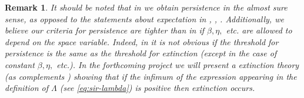 \documentclass[final]{amsart}
\newtheorem{rem}[thm]{Remark}
\numberwithin{thm}{section}
\numberwithin{equation}{section}
\begin{document}
\begin{rem}
    It should be noted that in  we obtain persistence in the almost sure sense, as opposed to the statements about expectation in \cite[Theorem 4.1]{stochastic-SIR-NN}, \cite[Theorem 3.3]{stochastic-SEIRS}, \cite[Theorem 3.1]{stochastic-SIR-analytical}. Additionally, we believe our criteria for persistence are tighter than in 
    \cite{stochastic-SIR-NN, stochastic-SEIRS, stochastic-SIR-analytical} if $\beta,\eta,$ etc. are allowed to depend on the space variable. Indeed, in \cite{stochastic-SIR-NN, stochastic-SEIRS, stochastic-SIR-analytical} it is not obvious if the threshold for persistence is the same as the threshold for extinction (except in the case of constant $\beta,\eta,$ etc.). In the forthcoming project we will present a extinction  theory (as \cite{extinction} complements \cite{persistence}) showing that if the infimum of the expression appearing in the definition of $\Lambda$ (see \eqref{eq:sir-lambda}) is positive then extinction occurs. 
\end{rem}
\end{document}
